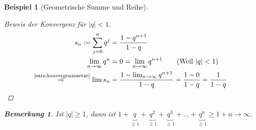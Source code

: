 \documentclass[11pt, twoside, a4paper]{article}
\theoremstyle{plain}
\newtheorem{bemerkung}[blockelement]{Bemerkung}
\newtheorem{beispiel}[blockelement]{Beispiel}
\newcommand{\abs}[1]{\left\lvert#1\right\rvert}
\newcommand{\impl}[0]{\Rightarrow{}}
\newcommand{\fromto}{\rightarrow{}}
\newcommand{\definedas}[0]{\coloneqq}
\newcommand{\annot}[3][]{\overset{\text{#3}}#1{#2}}
\begin{document}
\begin{beispiel}[Geometrische Summe und Reihe]

        \begin{proof}[Beweis der Konvergenz für $\abs{q} < 1$]
            \marginnote{[5. Dez]}
            \begin{align*}
                s_n\definedas \sum_{j=0}^{n} q^j &= \frac{1-q^{n+1}}{1-q}\\
                \lim_{n\fromto\infty} q^n &= 0 = \lim_{n\fromto\infty} q^{n+1}\tag{Weil $\abs{q} < 1$}\\
                \annot{\impl}{\ref{satz:konvergenzsaetze}} \lim s_n &= \frac{1-\lim_{n\fromto\infty} q^{n+1}}{1-q} = \frac{1-0}{1-q} = \frac{1}{1-q}\qedhere
            \end{align*}
        \end{proof}
        \begin{bemerkung}
            Ist $\abs{q}\geq 1$, dann ist $1+\underbrace{q}_{\geq 1}+\underbrace{q^2}_{\geq 1}+\underbrace{q^3}_{\geq 1}+\dots + \underbrace{q^n}_{\geq 1} \geq 1+n\fromto\infty$.
        \end{bemerkung}
    \end{beispiel}
\end{document}
